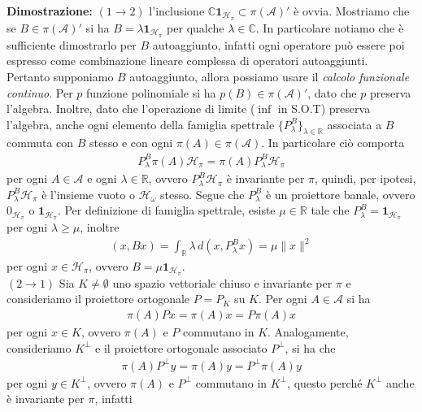 \documentclass{article}
\numberwithin{equation}{subsection}
\begin{document}
\textbf{Dimostrazione:} $(1 \rightarrow 2)$ l'inclusione $\mathbb{C}\mathbf{1}_{\mathcal{H}_\pi} \subset \pi(\mathscr{A})'$ è ovvia. Mostriamo che se $B \in \pi(\mathscr{A})'$ si ha $B = \lambda\mathbf{1}_{\mathcal{H}_\pi}$ per qualche $\lambda \in \mathbb{C}$. In particolare notiamo che è sufficiente dimostrarlo per $B$ autoaggiunto, infatti ogni operatore può essere poi espresso come combinazione lineare complessa di operatori autoaggiunti. \\
Pertanto supponiamo $B$ autoaggiunto, allora possiamo usare il \textit{calcolo funzionale continuo}. Per $p$ funzione polinomiale si ha $p(B) \in \pi(\mathscr{A})'$, dato che $p$ preserva l'algebra. Inoltre, dato che l'operazione di limite ($\inf$ in S.O.T) preserva l'algebra, anche ogni elemento della famiglia spettrale $\{P^B_\lambda\}_{\lambda \in \mathbb{R}}$ associata a $B$ commuta con $B$ stesso e con ogni $\pi(A) \in \pi(\mathscr{A})$. In particolare ciò comporta
\begin{align*}
    P^B_\lambda\pi(A)\mathcal{H}_\pi = \pi(A)P^B_\lambda\mathcal{H}_\pi
\end{align*}
per ogni $A \in \mathscr{A}$ e ogni $\lambda \in \mathbb{R}$, ovvero $P^B_\lambda\mathcal{H}_\pi$ è invariante per $\pi$, quindi, per ipotesi, $P^B_\lambda\mathcal{H}_\pi$ è l'insieme vuoto o $\mathcal{H}_\omega$ stesso. Segue che $P^B_\lambda$ è un proiettore banale, ovvero $0_{\mathcal{H}_\pi}$ o $\mathbf{1}_{\mathcal{H}_\pi}$. Per definizione di famiglia spettrale, esiste $\mu \in \mathbb{R}$ tale che $P^B_\lambda = \mathbf{1}_{\mathcal{H}_\pi}$ per ogni $\lambda \geq \mu$, inoltre
\begin{align*}
    (x, Bx) = \int_\mathbb{R} \lambda \, d(x, P^B_\lambda x) = \mu\|x\|^2
\end{align*}
per ogni $x \in \mathcal{H}_\pi$, ovvero $B = \mu\mathbf{1}_{\mathcal{H}_\pi}$. \\
$(2 \rightarrow 1)$ Sia $K \neq \emptyset$ uno spazio vettoriale chiuso e invariante per $\pi$ e consideriamo il proiettore ortogonale $P = P_K$ su $K$. Per ogni $A \in \mathscr{A}$ si ha
\begin{align*}
    \pi(A)Px = \pi(A)x = P\pi(A)x
\end{align*}
per ogni $x \in K$, ovvero $\pi(A)$ e $P$ commutano in $K$. Analogamente, consideriamo $K^\perp$ e il proiettore ortogonale associato $P^\perp$, si ha che
\begin{align*}
    \pi(A)P^\perp y = \pi(A)y = P^\perp\pi(A)y
\end{align*}
per ogni $y \in K^\perp$, ovvero $\pi(A)$ e $P^\perp$ commutano in $K^\perp$, questo perché $K^\perp$ anche è invariante per $\pi$, infatti
\end{document}
